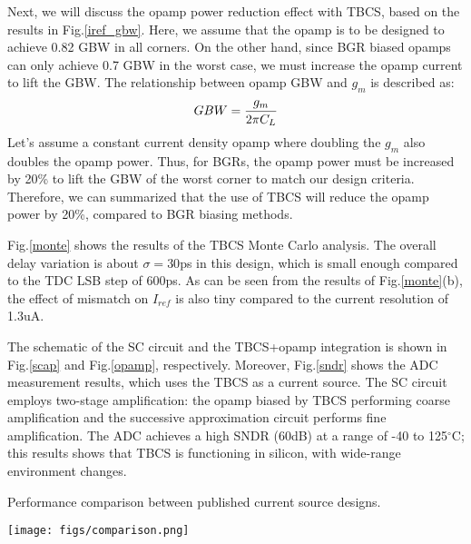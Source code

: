 \documentclass[paper]{ieice}
\begin{document}
Next, we will discuss the opamp power reduction effect with TBCS, based on the results in Fig.\ref{iref_gbw}. Here, we assume that the opamp is to be designed to achieve 0.82 GBW in all corners. On the other hand, since BGR biased opamps can only achieve 0.7 GBW in the worst case, we must increase the opamp current to lift the GBW. The relationship between opamp GBW and $g_m$ is described as:
\begin{eqnarray}
    \centering
    GBW = \frac{g_m}{2 \pi C_L}
\end{eqnarray}
Let's assume a constant current density opamp where doubling the $g_m$ also doubles the opamp power. Thus, for BGRs, the opamp power must be increased by 20\% to lift the GBW of the worst corner to match our design criteria. Therefore, we can summarized that the use of TBCS will reduce the opamp power by 20\%, compared to BGR biasing methods.

Fig.\ref{monte} shows the results of the TBCS Monte Carlo analysis. The overall delay variation is about $\sigma= 30$ps in this design, which is small enough compared to the TDC LSB step of 600ps. As can be seen from the results of Fig.\ref{monte}(b), the effect of mismatch on $I_{ref}$ is also tiny compared to the current resolution of 1.3uA. %

The schematic of the SC circuit and the TBCS+opamp integration is shown in Fig.\ref{scap} and Fig.\ref{opamp}, respectively. Moreover, Fig.\ref{sndr} shows the ADC measurement results, which uses the TBCS as a current source. The SC circuit employs two-stage amplification: the opamp biased by TBCS performing coarse amplification and the successive approximation circuit performs fine amplification. The ADC achieves a high SNDR (60dB) at a range of -40 to 125$^\circ$C; this results shows that TBCS is functioning in silicon, with wide-range environment changes.

\begin{table*}[!t]
\centering
\caption{Performance comparison between published current source designs.}
 \texttt{[image: figs/comparison.png]}
\label{comparison}
\end{table*}
\end{document}
